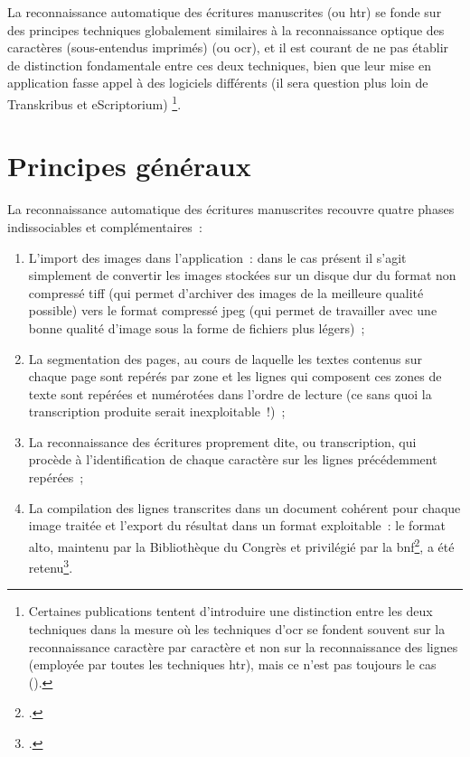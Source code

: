 \documentclass[a4paper,12pt,twoside]{book}
\begin{document}
		La reconnaissance automatique des écritures manuscrites (ou \gls{htr}) se fonde sur des principes techniques globalement similaires à la reconnaissance optique des caractères (sous-entendus imprimés) (ou \gls{ocr}), et il est courant de ne pas établir de distinction fondamentale entre ces deux techniques, bien que leur mise en application fasse appel à des logiciels différents (il sera question plus loin de Transkribus et eScriptorium)
		\footnote{Certaines publications tentent d'introduire une distinction entre les deux techniques dans la mesure où les techniques d'\gls{ocr} se fondent souvent sur la reconnaissance caractère par caractère et non sur la reconnaissance des lignes (employée par toutes les techniques \gls{htr}), mais ce n'est pas toujours le cas (\cite{stokesEScriptoriumVREManuscript2021}).}.
		
		\section{Principes généraux}
		
			La reconnaissance automatique des écritures manuscrites recouvre quatre phases indissociables et complémentaires~:
			
			\begin{enumerate}
				\item L'import des images dans l'application~: dans le cas présent il s'agit simplement de convertir les images stockées sur un disque dur du format non compressé \textsf{tiff} (qui permet d'archiver des images de la meilleure qualité possible) vers le format compressé \textsf{jpeg} (qui permet de travailler avec une bonne qualité d'image sous la forme de fichiers plus légers)~;
				\item La segmentation des pages, au cours de laquelle les textes contenus sur chaque page sont repérés par zone et les lignes qui composent ces zones de texte sont repérées et numérotées dans l'ordre de lecture (ce sans quoi la transcription produite serait inexploitable~!)~;
				\item La reconnaissance des écritures proprement dite, ou transcription, qui procède à l'identification de chaque caractère sur les lignes précédemment repérées~;
				\item La compilation des lignes transcrites dans un document cohérent pour chaque image traitée et l'export du résultat dans un format exploitable~: le format \gls{alto}, maintenu par la Bibliothèque du Congrès et privilégié par la \gls{bnf}\footcite{TechniquesFormatsConversion2022}, a été retenu\footcite{stokesEScriptoriumVREManuscript2021}.
			\end{enumerate}
				
\end{document}
